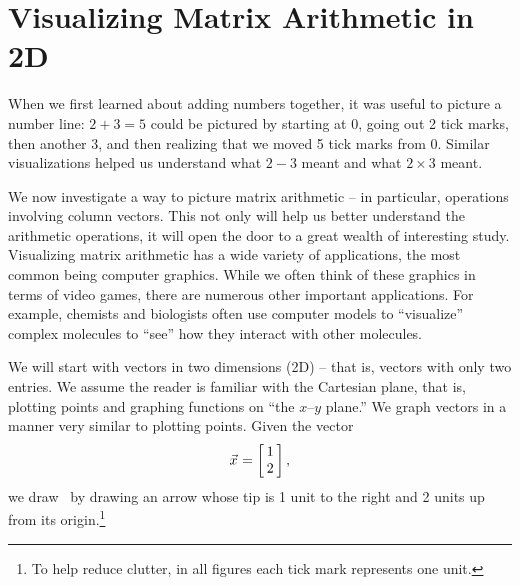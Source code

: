 \clearpage
\section{Visualizing Matrix Arithmetic in 2D}\label{sec:geom_1}




When we first learned about adding numbers together, it was useful to picture a number line: $2+3=5$ could be pictured by starting at 0, going out 2 tick marks, then another 3, and then realizing that we moved 5 tick marks from 0. Similar visualizations helped us understand what $2-3$ meant and what $2\times 3$ meant.


We now investigate a way to picture matrix arithmetic -- in particular, operations involving column vectors. This not only will help us better understand the arithmetic operations, it will open the door to a great wealth of interesting study. Visualizing matrix arithmetic has a wide variety of applications, the most common being computer graphics. While we often think of these graphics in terms of video games, there are numerous other important applications. For example, chemists and biologists often use computer models to ``visualize'' complex molecules to ``see'' how they interact with other molecules.%


We will start with vectors in two dimensions (2D) -- that is, vectors with only two entries. We assume the reader is familiar with the Cartesian plane, that is, plotting points and graphing functions on ``the $x$--$y$ plane.'' We graph vectors in a manner very similar to plotting points. Given the vector $$\vx = \bmx{c}1\\2\emx,$$ we draw \vx\ by drawing an arrow whose tip is 1 unit to the right and 2 units up from its origin.\footnote{To help reduce clutter, in all figures each tick mark represents one unit.} 

